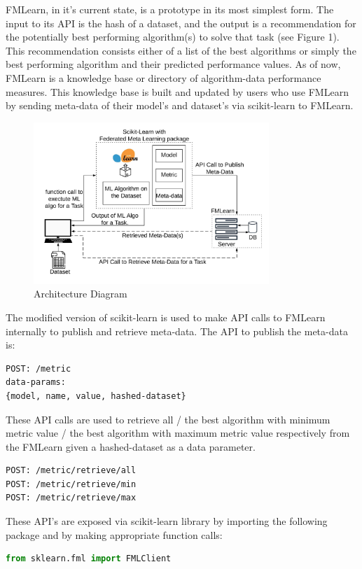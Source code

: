 \documentclass{article}
\begin{document}
FMLearn, in it’s current state, is a prototype in its most simplest form. The input to its API is the hash of a dataset, and the output is a recommendation for the potentially best performing algorithm(s) to solve that task (see Figure 1). This recommendation consists either of a list of the best algorithms or simply the best performing algorithm and their predicted performance values. As of now, FMLearn is a knowledge base or directory of algorithm-data performance measures. This knowledge base is built and updated by users who use FMLearn by sending meta-data of their model’s and dataset’s via scikit-learn to FMLearn.

\begin{figure}[ht]
    \centering
    \includegraphics[width=3.5in]{architecture-diagram.jpeg}
    \caption{Architecture Diagram}
    \label{architecture-diagram}
\end{figure}

The modified version of scikit-learn is used to make API calls to FMLearn internally to publish and retrieve meta-data. The API to publish the meta-data is:
\begin{lstlisting}
POST: /metric
data-params: 
{model, name, value, hashed-dataset}
\end{lstlisting}

These API calls are used to retrieve all / the best algorithm with minimum metric value / the best algorithm with maximum metric value respectively from the FMLearn given a hashed-dataset as a data parameter.
\begin{lstlisting}
POST: /metric/retrieve/all
POST: /metric/retrieve/min
POST: /metric/retrieve/max
\end{lstlisting}

These API’s are exposed via scikit-learn library by importing the following package and by making appropriate function calls:
\begin{lstlisting}[language=python]
from sklearn.fml import FMLClient
\end{lstlisting}
\end{document}
